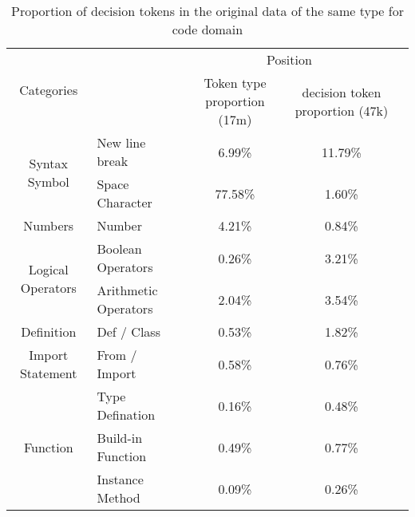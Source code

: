 \begin{table*}[htbp]
  \caption{Proportion of decision tokens in the original data of the same type for code domain}

    \begin{minipage}{\textwidth}
    
   \setlength{\abovecaptionskip}{7pt}
   \setlength{\cmidrulewidth}{0.01em}
   \renewcommand{\tabcolsep}{10pt}
   \renewcommand{\arraystretch}{1.2}
   \begin{tabular}{cl|ccc}
   
   \toprule
        \multirow{2}{*}{Categories} & \hspace{2em}\multirow{2}{*}{Subtypes} & \multicolumn{2}{c}{Position}\\
        \cmidrule[\cmidrulewidth](lr){3-4}
          & & \hspace{0.2em}Token type proportion (17m) &\hspace{1.0em}decision token proportion (47k)\\
         \midrule
         \multirow{2}{*}{Syntax Symbol} &
          \vline \hspace{0.4em} New line break  & 6.99\% & 11.79\% \\
         & \vline \hspace{0.5em} Space Character  & 77.58\% & 1.60\% \\
             

        \multirow{1}{*}{Numbers}& \hspace{2.0em} Number & 4.21\% & 0.84\% \\
        
         \multirow{2}{*}{Logical Operators} &
        \vline \hspace{0.3em} Boolean Operators  & 0.26\% & 3.21\% \\
        & \vline \hspace{0em}Arithmetic Operators & 2.04\% & 3.54\% \\
        
        
        \multirow{1}{*}{Definition} & \hspace{1.5em} Def / Class & 0.53\% & 1.82\% \\
      
         \multirow{1}{*}{Import Statement}& \hspace{0.8em} From / Import & 0.58\% & 0.76\% \\

         \multirow{3}{*}{Function}& \vline \hspace{0.6em} Type Defination & 0.16\% & 0.48\% \\
         & \vline \hspace{0.5em} Build-in Function & 0.49\% & 0.77\% \\
         & \vline \hspace{0.8em} Instance Method & 0.09\% & 0.26\% \\
         

\end{tabular}
\end{minipage}
\end{table*}
